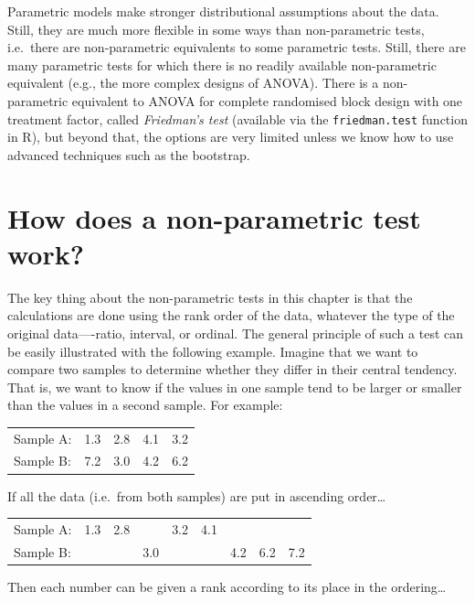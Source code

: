 \documentclass[
]{book}
\begin{document}
Parametric models make stronger distributional assumptions about the data. Still, they are much more flexible in some ways than non-parametric tests, i.e.~there are non-parametric equivalents to some parametric tests. Still, there are many parametric tests for which there is no readily available non-parametric equivalent (e.g., the more complex designs of ANOVA). There is a non-parametric equivalent to ANOVA for complete randomised block design with one treatment factor, called \emph{Friedman's test} (available via the \texttt{friedman.test} function in R), but beyond that, the options are very limited unless we know how to use advanced techniques such as the bootstrap.

\hypertarget{non-par-intro}{%
\section{How does a non-parametric test work?}\label{non-par-intro}}

The key thing about the non-parametric tests in this chapter is that the calculations are done using the rank order of the data, whatever the type of the original data----ratio, interval, or ordinal. The general principle of such a test can be easily illustrated with the following example. Imagine that we want to compare two samples to determine whether they differ in their central tendency. That is, we want to know if the values in one sample tend to be larger or smaller than the values in a second sample. For example:

\begin{longtable}[]{@{}lcccc@{}}
\toprule
& & & & \\
\midrule
\endhead
Sample A: & 1.3 & 2.8 & 4.1 & 3.2 \\
Sample B: & 7.2 & 3.0 & 4.2 & 6.2 \\
\bottomrule
\end{longtable}

If all the data (i.e.~from both samples) are put in ascending order\ldots{}

\begin{longtable}[]{@{}lcclcclll@{}}
\toprule
& & & & & & & & \\
\midrule
\endhead
Sample A: & 1.3 & 2.8 & & 3.2 & 4.1 & & & \\
Sample B: & & & 3.0 & & & 4.2 & 6.2 & 7.2 \\
\bottomrule
\end{longtable}

Then each number can be given a rank according to its place in the ordering\ldots{}
\end{document}
